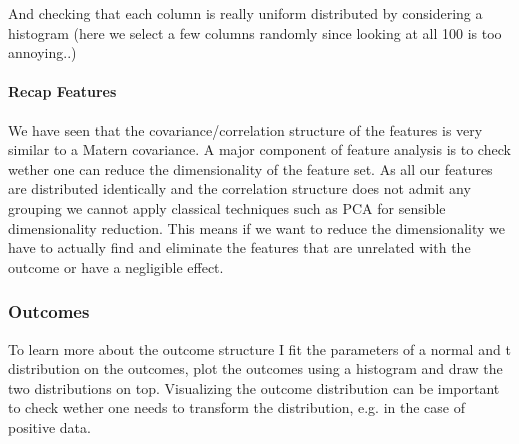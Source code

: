 \documentclass[letterpaper,10pt,english]{sphinxmanual}
\begin{document}
And checking that each column is really uniform distributed by considering a histogram (here we select a few columns randomly since looking at all 100 is too annoying..)

\begin{sphinxVerbatim}[commandchars=\\\{\}]
   \PYG{p}{[}  \PYG{p}{]}
        \PYG{p}{[}\PYG{p}{]} 
         \PYG{p}{[} \PYG{p}{]}
\end{sphinxVerbatim}

\noindent{}

\noindent{}

\noindent{}


\paragraph{Recap \sphinxhyphen{} Features}
\label{\detokenize{simulated_reverse_engineering:recap-features}}
We have seen that the covariance/correlation structure of the features is very similar to a Matern covariance.
A major component of feature analysis is to check wether one can reduce the dimensionality of the feature set.
As all our features are distributed identically and the correlation structure does not admit any grouping we cannot apply classical techniques such as PCA for sensible dimensionality reduction.
This means if we want to reduce the dimensionality we have to actually find and eliminate the features that are unrelated with the outcome or have a negligible effect.


\subsubsection{Outcomes}
\label{\detokenize{simulated_reverse_engineering:outcomes}}
To learn more about the outcome structure I fit the parameters of a normal and t distribution on the outcomes, plot the outcomes using a histogram and draw the two distributions on top. Visualizing the outcome distribution can be important to check wether one needs to transform the distribution, e.g. in the case of positive data.
\end{document}
